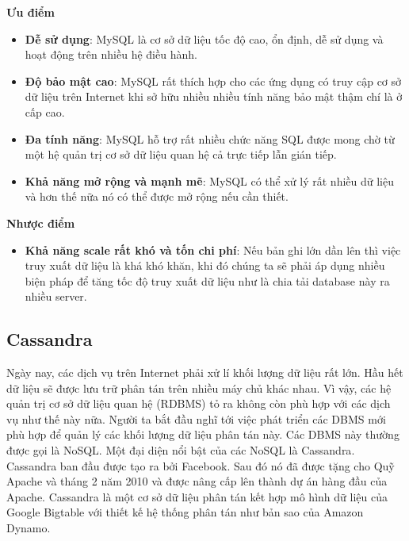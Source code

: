             \textbf{Ưu điểm}
            
            \begin{itemize}
                \item \textbf{Dễ sử dụng}: MySQL là cơ sở dữ liệu tốc độ cao, ổn định, dễ sử dụng và hoạt động trên nhiều hệ điều hành.
                \item \textbf{Độ bảo mật cao}:  MySQL rất thích hợp cho các ứng dụng có truy cập cơ sở dữ liệu trên Internet khi sở hữu nhiều nhiều tính năng bảo mật thậm chí là ở cấp cao.
                \item \textbf{Đa tính năng}: MySQL hỗ trợ rất nhiều chức năng SQL được mong chờ từ một hệ quản trị cơ sở dữ liệu quan hệ cả trực tiếp lẫn gián tiếp.
                \item \textbf{Khả năng mở rộng và mạnh mẽ}: MySQL có thể xử lý rất nhiều dữ liệu và hơn thế nữa nó có thể được mở rộng nếu cần thiết.
            \end{itemize}
            
            \textbf{Nhược điểm}
            
            \begin{itemize}
                \item \textbf{Khả năng scale rất khó và tốn chi phí}: Nếu bản ghi lớn dần lên thì việc truy xuất dữ liệu là khá khó khăn, khi đó chúng ta sẽ phải áp dụng nhiều biện pháp để tăng tốc độ truy xuất dữ liệu như là chia tải database này ra nhiều server.	
            \end{itemize}	
            \subsection{Cassandra}
            
            Ngày nay, các dịch vụ trên Internet phải xử lí khối lượng dữ liệu rất lớn. Hầu hết dữ liệu sẽ được lưu trữ phân tán trên nhiều máy chủ khác nhau. Vì vậy, các hệ quản trị cơ sở dữ liệu quan hệ (RDBMS) tỏ ra không còn phù hợp với các dịch vụ như thế này nữa. Người ta bắt đầu nghĩ tới việc phát triển các DBMS mới phù hợp để quản lý các khối lượng dữ liệu phân tán này. Các DBMS này thường được gọi là NoSQL. Một đại diện nổi bật của các NoSQL là Cassandra\cite{Cassandra}.\\
            
            Cassandra ban đầu được tạo ra bởi Facebook. Sau đó nó đã được tặng cho Quỹ Apache và tháng 2 năm 2010 và được nâng cấp lên thành dự án hàng đầu của Apache. Cassandra là một cơ sở dữ liệu phân tán kết hợp mô hình dữ liệu của Google Bigtable với thiết kế hệ thống phân tán như bản sao của Amazon Dynamo.\\
            
